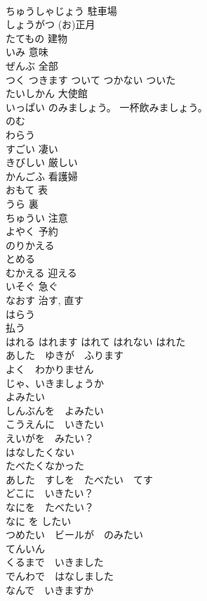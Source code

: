 \documentclass[8pt]{extreport}
\begin{document}
\begin{CJK}{UTF8}{min}
\\	ちゅうしゃじょう	駐車場
\\	しょうがつ	(お)正月
\\	たてもの	建物
\\	いみ	意味
\\	ぜんぶ	全部
\\	つく	つきます	ついて	つかない	ついた	
\\	たいしかん	大使館
\\	いっぱい のみましょう。	一杯飲みましょう。
\\	のむ	
\\	わらう	
\\	すごい	凄い
\\	きびしい	厳しい
\\	かんごふ	看護婦
\\	おもて	表
\\	うら	裏
\\	ちゅうい	注意
\\	よやく	予約
\\	のりかえる	
\\	とめる	
\\	むかえる	迎える
\\	いそぐ	急ぐ
\\	なおす	治す, 直す
\\	はらう	
\\	払う
\\	はれる	はれます	はれて	はれない	はれた	
\\	あした　ゆきが　ふります	
\\	よく　わかりません	
\\	じゃ、いきましょうか	
\\	よみたい	
\\	しんぶんを　よみたい	
\\	こうえんに　いきたい	
\\	えいがを　みたい？	
\\	はなしたくない	
\\	たべたくなかった	
\\	あした　すしを　たべたい　てす	
\\	どこに　いきたい？	
\\	なにを　たべたい？	
\\	なに を したい	
\\	つめたい　ビールが　のみたい	
\\	てんいん	
\\	くるまで　いきました	
\\	でんわで　はなしました	
\\	なんで　いきますか	

\end{CJK}
\end{document}
